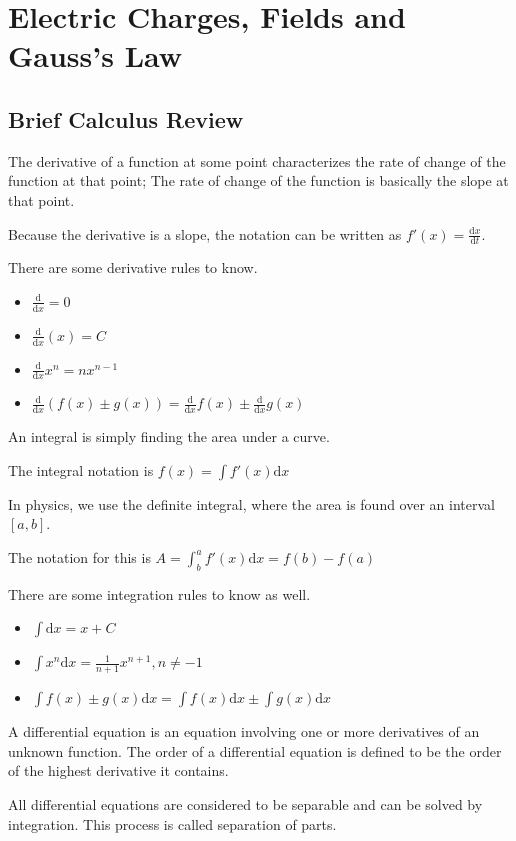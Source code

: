 \documentclass[../em.tex]{subfiles}
\begin{document}
\chapter{Electric Charges, Fields and Gauss's Law}
\section*{Brief Calculus Review}
The derivative of a function at some point characterizes the rate of change of the function at that point; The rate of change of the function is basically the slope at that point.

Because the derivative is a slope, the notation can be written as $f'(x)=\frac{\mathrm{d}x}{\mathrm{d}t}$.

There are some derivative rules to know.
\begin{itemize}
    \item $\frac{\mathrm{d}}{\mathrm{d}x} = 0$
    \item $\frac{\mathrm{d}}{\mathrm{d}x}(x) = C$
    \item $\frac{\mathrm{d}}{\mathrm{d}x}x^n = nx^{n-1}$
    \item $\frac{\mathrm{d}}{\mathrm{d}x}(f(x)\pm g(x))=\frac{\mathrm{d}}{\mathrm{d}x}f(x)\pm \frac{\mathrm{d}}{\mathrm{d}x}g(x)$
\end{itemize}
An integral is simply finding the area under a curve. 

The integral notation is $f(x)=\int{f'(x)\mathrm{d}x}$

In physics, we use the definite integral, where the area is found over an interval $[a,b]$.

The notation for this is $A = \int_b^a{f'(x)\mathrm{d}x}=f(b)-f(a)$

There are some integration rules to know as well.
\begin{itemize}
    \item $\int{\mathrm{d}x} = x+C$
    \item $\int{x^n\mathrm{d}x}=\frac{1}{n+1}x^{n+1}, n \neq -1$
    \item $\int{f(x)\pm g(x)\mathrm{d}x}=\int{f(x)\mathrm{d}x}\pm \int{g(x)\mathrm{d}x}$
\end{itemize}
A differential equation is an equation involving one or more derivatives of an unknown function. The order of a differential equation is defined to be the order of the highest derivative it contains.

All differential equations are considered to be separable and can be solved by integration. This process is called separation of parts.
\end{document}
